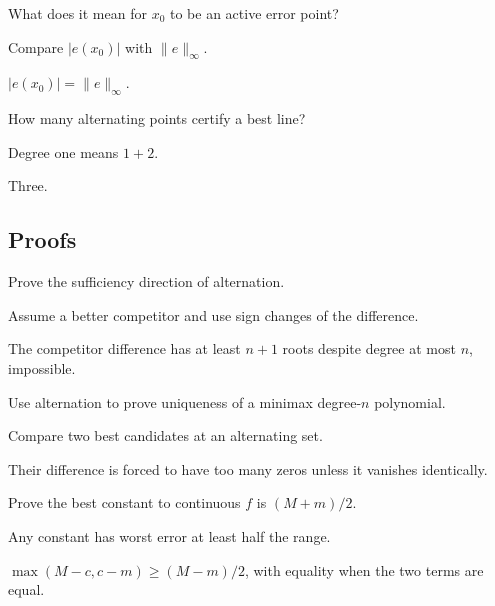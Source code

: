 \begin{exercise}\label{exr:ii23-expand-04}
What does it mean for \(x_0\) to be an active error point?
\end{exercise}
\begin{hint}
Compare \(|e(x_0)|\) with \(\|e\|_\infty\).
\end{hint}
\begin{solution}
\(|e(x_0)|=\|e\|_\infty\).
\end{solution}

\begin{exercise}\label{exr:ii23-expand-05}
How many alternating points certify a best line?
\end{exercise}
\begin{hint}
Degree one means \(1+2\).
\end{hint}
\begin{solution}
Three.
\end{solution}

\subsection*{Proofs}

\begin{exercise}[Sufficiency]\label{exr:ii23-expand-06}
Prove the sufficiency direction of alternation.
\end{exercise}
\begin{hint}
Assume a better competitor and use sign changes of the difference.
\end{hint}
\begin{solution}
The competitor difference has at least \(n+1\) roots despite degree at most \(n\), impossible.
\end{solution}

\begin{exercise}[Uniqueness]\label{exr:ii23-expand-07}
Use alternation to prove uniqueness of a minimax degree-\(n\) polynomial.
\end{exercise}
\begin{hint}
Compare two best candidates at an alternating set.
\end{hint}
\begin{solution}
Their difference is forced to have too many zeros unless it vanishes identically.
\end{solution}

\begin{exercise}\label{exr:ii23-expand-08}
Prove the best constant to continuous \(f\) is \((M+m)/2\).
\end{exercise}
\begin{hint}
Any constant has worst error at least half the range.
\end{hint}
\begin{solution}
\(\max(M-c,c-m)\ge(M-m)/2\), with equality when the two terms are equal.
\end{solution}

